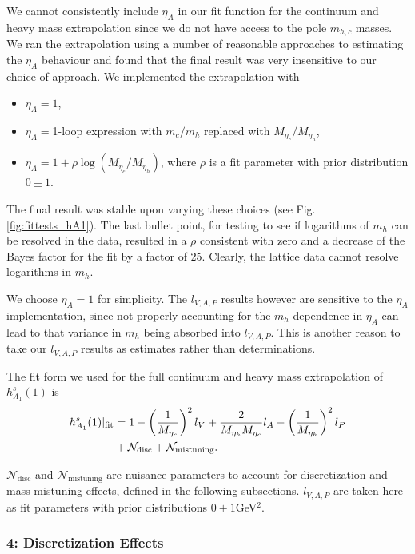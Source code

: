 We cannot consistently include $\eta_A$ in our fit function for the continuum and heavy mass extrapolation since we do not have access to the pole $m_{h,c}$ masses. We ran the extrapolation using a number of reasonable approaches to estimating the $\eta_A$ behaviour and found that the final result was very insensitive to our choice of approach. We implemented the extrapolation with
\begin{itemize}
\item
  $\eta_A=1$,
\item
  $\eta_A = $1-loop expression with $m_c/m_h$ replaced with $M_{\eta_c}/M_{\eta_h}$,
\item
  $\eta_A = 1 + \rho \log(M_{\eta_c}/M_{\eta_h})$, where $\rho$ is a fit parameter with prior distribution $0\pm 1$.
\end{itemize}

The final result was stable upon varying these choices (see Fig. \ref{fig:fittests_hA1}). The last bullet point, for testing to see if logarithms of $m_h$ can be resolved in the data, resulted in a $\rho$ consistent with zero and a decrease of the Bayes factor for the fit by a factor of 25. Clearly, the lattice data cannot resolve logarithms in $m_h$.

We choose $\eta_A=1$ for simplicity. The $l_{V,A,P}$ results however are sensitive to the $\eta_A$ implementation, since not properly accounting for the $m_h$ dependence in $\eta_A$ can lead to that variance in $m_h$ being absorbed into $l_{V,A,P}$. This is another reason to take our $l_{V,A,P}$ results as estimates rather than determinations.

The fit form we used for the full continuum and heavy mass extrapolation of $h_{A_1}^s(1)$ is
\begin{align}
  h^s_{A_1}(1)|_{\text{fit}} &= 1 - \left({1\over M_{\eta_c}}\right)^2 l_V + {2\over M_{\eta_h}M_{\eta_c}} l_A- \left({1\over M_{\eta_h}}\right)^2 l_P  \nonumber \\ &+ \mathcal{N}_{\text{disc}} + \mathcal{N}_{\text{mistuning}}.
  \label{eq:fitform_BsDsstar}
\end{align}

$\mathcal{N}_{\text{disc}}$ and $\mathcal{N}_{\text{mistuning}}$ are nuisance parameters to account for discretization and mass mistuning effects, defined in the following subsections. $l_{V,A,P}$ are taken here as fit parameters with prior distributions $0\pm 1 $GeV$^2$.

\subsubsection{4: Discretization Effects}

